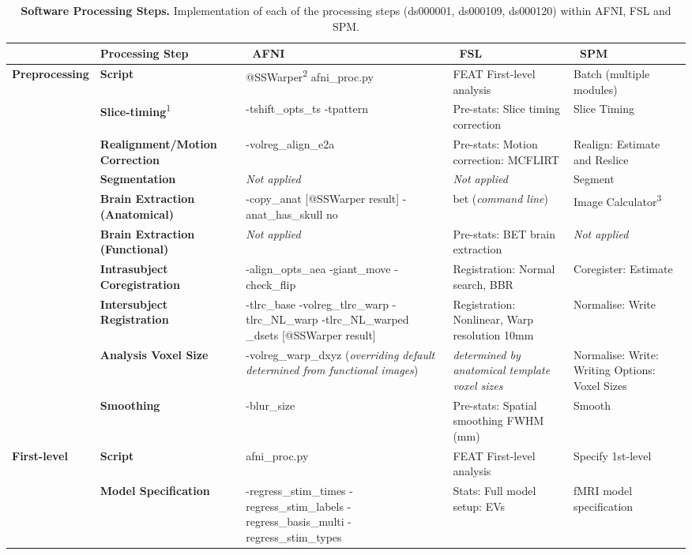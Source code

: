 \begin{onehalfspace}
\begin{table}[htbp]
\caption{\textbf{Software Processing Steps.} Implementation of  each of the processing steps (ds000001, ds000109, ds000120) within AFNI, FSL and SPM.}
\centering
\footnotesize
\hspace*{-1.5cm}
\begin{tabular}{@{}p{}*{4}{L{\tabcolsep\relax}}@{}}
\toprule
& \textbf{Processing Step} & \ \textbf{AFNI} & \ \textbf{FSL} & \ \textbf{SPM} \\
\midrule
\textbf{Preprocessing} & \textbf{Script} & @SSWarper\textsuperscript{2} afni\_proc.py & FEAT First-level analysis & Batch (multiple modules) \\
\cmidrule(lr){2-5} 
& \textbf{Slice-timing}\textsuperscript{1} & -tshift\_opts\_ts -tpattern  & Pre-stats: Slice timing correction & Slice Timing \\
\cmidrule(lr){2-5} 
& \textbf{Realignment/Motion Correction} & -volreg\_align\_e2a & Pre-stats: Motion correction: MCFLIRT & Realign: Estimate and Reslice \\
\cmidrule(lr){2-5}
& \textbf{Segmentation} & \textit{Not applied} & \textit{Not applied} & Segment \\ 
\cmidrule(lr){2-5}
& \textbf{Brain Extraction (Anatomical)} & -copy\_anat [@SSWarper result] -anat\_has\_skull no & bet (\textit{command line}) & Image Calculator\textsuperscript{3} \\ 
\cmidrule(lr){2-5}
& \textbf{Brain Extraction (Functional)} & \textit{Not applied} & Pre-stats: BET brain extraction & \textit{Not applied} \\ 
\cmidrule(lr){2-5}
& \textbf{Intrasubject Coregistration} & -align\_opts\_aea -giant\_move -check\_flip & Registration: Normal search, BBR & Coregister: Estimate \\ 
\cmidrule(lr){2-5}
& \textbf{Intersubject Registration} & -tlrc\_base -volreg\_tlrc\_warp -tlrc\_NL\_warp -tlrc\_NL\_warped \_dsets [@SSWarper result] & Registration: Nonlinear, Warp resolution 10mm & Normalise: Write \\
\cmidrule(lr){2-5}
& \textbf{Analysis Voxel Size} & -volreg\_warp\_dxyz (\textit{overriding default determined from functional images}) & \textit{determined by anatomical template voxel sizes} & Normalise: Write: Writing Options: Voxel Sizes \\
\cmidrule(lr){2-5}
& \textbf{Smoothing} & -blur\_size & Pre-stats: Spatial smoothing FWHM (mm) & Smooth \\
\midrule
\textbf{First-level} & \textbf{Script} & afni\_proc.py & FEAT First-level analysis & Specify 1st-level \\
 \cmidrule(lr){2-5}
 & \textbf{Model Specification} & -regress\_stim\_times -regress\_stim\_labels -regress\_basis\_multi -regress\_stim\_types & Stats: Full model setup: EVs & fMRI model specification \\
  \cmidrule(lr){2-5}
\end{tabular}
\label{tab:software_processing}
\end{table}


\end{onehalfspace}
